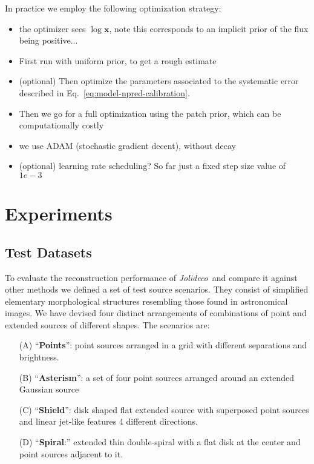 \documentclass[twocolumn]{aastex631}
\newcommand{\jolideco}{\textit{Jolideco}~}
\begin{document}
    In practice we employ the following optimization strategy:
    \begin{itemize}
        \item the optimizer sees $\log{\mathbf{x}}$, note this corresponds to an implicit prior of the flux being positive...
        \item First run with uniform prior, to get a rough estimate
        \item (optional) Then optimize the parameters associated to the systematic error described in Eq.~\ref{eq:model-npred-calibration}.
        \item Then we go for a full optimization using the patch prior, which can be computationally costly
        \item we use ADAM (stochastic gradient decent), without decay
        \item  (optional) learning rate scheduling? So far just a fixed step size value of $1e-3$
    \end{itemize}
    
    
        
    \section{Experiments}
    \subsection{Test Datasets}
    \label{subsec:test-datasets}
    To evaluate the reconstruction performance of \jolideco and compare it against other methods we defined a set of test source scenarios. They consist of simplified elementary morphological structures resembling those found in astronomical images. We have devised four distinct arrangements of combinations of point and extended sources of different shapes. The scenarios are:
    
    \begin{itemize}
        \item[(A)] {\enquote{\bf Points}:} point sources arranged in a grid with different separations and brightness. 
        \item[(B)] {\enquote{\bf Asterism}:} a set of four point sources arranged around an extended Gaussian source
        \item[(C)] {\enquote{\bf Shield}:} disk shaped flat extended source with superposed point sources and linear jet-like features 4 different directions.
        \item[(D)] \enquote{{\bf Spiral}:} extended thin double-spiral with a flat disk at the center and point sources adjacent to it. 
    \end{itemize}
\end{document}
